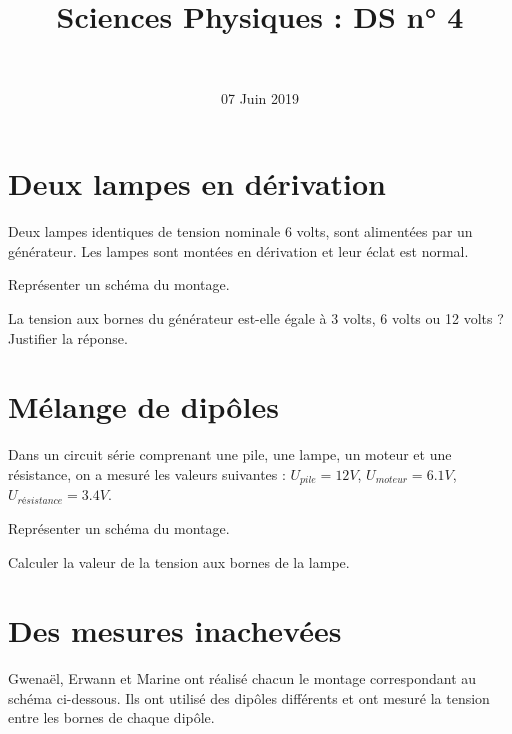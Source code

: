 \documentclass[a4paper,11pt]{exam}
\author{\ }
\date{07 Juin 2019}
\title{Sciences Physiques : DS n° 4}
\begin{document}
%	

	\maketitle
\vspace*{-0.5cm}	
\section{Deux lampes en dérivation}

Deux lampes identiques de tension nominale 6 volts, sont alimentées par un générateur. Les lampes sont montées en dérivation et leur éclat est normal.

\begin{questions}
	\question Représenter un schéma du montage.
	
	
	\question La tension aux bornes du générateur est-elle égale à 3 volts, 6 volts ou 12 volts ? Justifier la réponse.
	
\end{questions}

\section{Mélange de dipôles}

Dans un circuit série comprenant une pile, une lampe, un moteur et une résistance, on a mesuré les valeurs suivantes : $U_{pile}= 12 V$, $U_{moteur}= \num{6.1} V$, $U_{résistance}= \num{3.4} V$.

\begin{questions}
	\question Représenter un schéma du montage.
	
	
	\question Calculer la valeur de la tension aux bornes de la lampe.
\end{questions}

\section{Des mesures inachevées}

Gwenaël, Erwann et Marine ont réalisé chacun le montage correspondant au schéma ci-dessous. Ils ont utilisé des dipôles différents et ont mesuré la tension entre les bornes de chaque dipôle.
\end{document}
